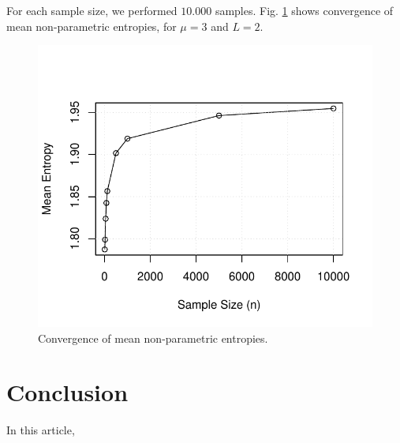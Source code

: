 \documentclass[conference]{IEEEtran}
\begin{document}
For each sample size, we performed $10.000$ samples. Fig. \ref{F4} shows convergence of mean non-parametric entropies, for $\mu=3$ and $L=2$. 
%
\begin{figure}[H] 
\centering
	\includegraphics[scale=0.5]{../../../Figures/PDF/mean_entropies1}\vspace{-1.5mm} 
	\caption{Convergence of mean non-parametric entropies.}
	\label{F4}
\end{figure}
\section{Conclusion}\label{sec_09}

In this article, 


%


\end{document}
